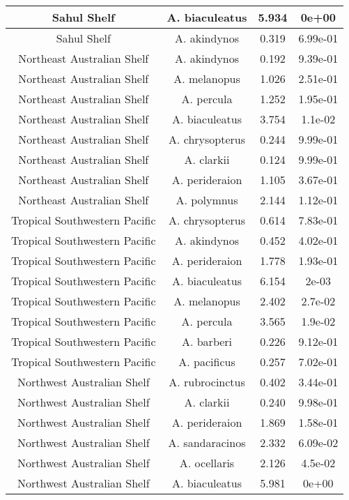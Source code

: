 \begin{table}[!h]
\begin{tabular}[t]{c|c|c|c}
\hline
Sahul Shelf & A. biaculeatus & 5.934 & 0e+00\\
\hline
Sahul Shelf & A. akindynos & 0.319 & 6.99e-01\\
\hline
Northeast Australian Shelf & A. akindynos & 0.192 & 9.39e-01\\
\hline
Northeast Australian Shelf & A. melanopus & 1.026 & 2.51e-01\\
\hline
Northeast Australian Shelf & A. percula & 1.252 & 1.95e-01\\
\hline
Northeast Australian Shelf & A. biaculeatus & 3.754 & 1.1e-02\\
\hline
Northeast Australian Shelf & A. chrysopterus & 0.244 & 9.99e-01\\
\hline
Northeast Australian Shelf & A. clarkii & 0.124 & 9.99e-01\\
\hline
Northeast Australian Shelf & A. perideraion & 1.105 & 3.67e-01\\
\hline
Northeast Australian Shelf & A. polymnus & 2.144 & 1.12e-01\\
\hline
Tropical Southwestern Pacific & A. chrysopterus & 0.614 & 7.83e-01\\
\hline
Tropical Southwestern Pacific & A. akindynos & 0.452 & 4.02e-01\\
\hline
Tropical Southwestern Pacific & A. perideraion & 1.778 & 1.93e-01\\
\hline
Tropical Southwestern Pacific & A. biaculeatus & 6.154 & 2e-03\\
\hline
Tropical Southwestern Pacific & A. melanopus & 2.402 & 2.7e-02\\
\hline
Tropical Southwestern Pacific & A. percula & 3.565 & 1.9e-02\\
\hline
Tropical Southwestern Pacific & A. barberi & 0.226 & 9.12e-01\\
\hline
Tropical Southwestern Pacific & A. pacificus & 0.257 & 7.02e-01\\
\hline
Northwest Australian Shelf & A. rubrocinctus & 0.402 & 3.44e-01\\
\hline
Northwest Australian Shelf & A. clarkii & 0.240 & 9.98e-01\\
\hline
Northwest Australian Shelf & A. perideraion & 1.869 & 1.58e-01\\
\hline
Northwest Australian Shelf & A. sandaracinos & 2.332 & 6.09e-02\\
\hline
Northwest Australian Shelf & A. ocellaris & 2.126 & 4.5e-02\\
\hline
Northwest Australian Shelf & A. biaculeatus & 5.981 & 0e+00\\

\end{tabular}
\end{table}
